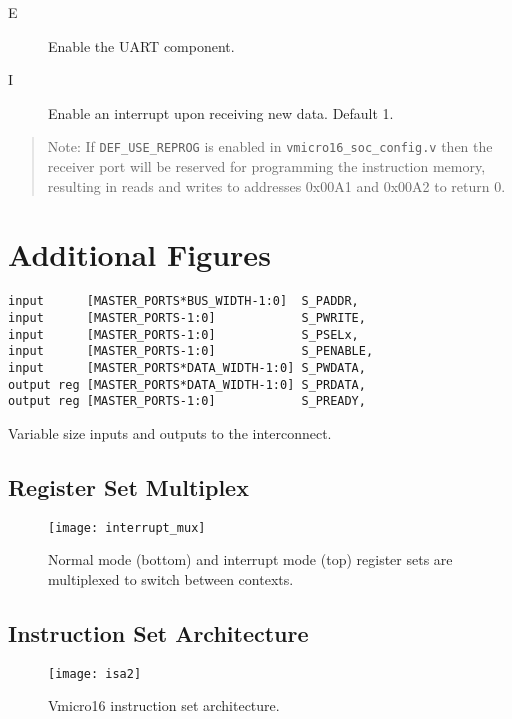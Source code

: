 \begin{appendices}
\begin{description}
\item [E] Enable the UART  component.
\item [I] Enable an interrupt upon receiving new data. Default 1.
\end{description}

\begin{quote}
Note: If \verb|DEF_USE_REPROG| is enabled in \verb|vmicro16_soc_config.v| then the receiver port will be reserved for programming the instruction memory, resulting in reads and writes to addresses 0x00A1 and 0x00A2 to return 0.
\end{quote}


\chapter{Additional Figures}

\begin{listing}[H]
\centering
\begin{verbatim}
input      [MASTER_PORTS*BUS_WIDTH-1:0]  S_PADDR,
input      [MASTER_PORTS-1:0]            S_PWRITE,
input      [MASTER_PORTS-1:0]            S_PSELx,
input      [MASTER_PORTS-1:0]            S_PENABLE,
input      [MASTER_PORTS*DATA_WIDTH-1:0] S_PWDATA,
output reg [MASTER_PORTS*DATA_WIDTH-1:0] S_PRDATA,
output reg [MASTER_PORTS-1:0]            S_PREADY,
\end{verbatim}
\caption{Variable size inputs and outputs to the interconnect.}
\label{lst:widemaster}
\end{listing}

\section{Register Set Multiplex}
\begin{figure}[H]
\centering
\texttt{[image: interrupt\_mux]}
\caption{Normal mode (bottom) and interrupt mode (top) register sets are multiplexed to switch between contexts.}
\label{fig:regmult}
\end{figure}


\section{Instruction Set Architecture}
\begin{figure}[H]
\centering
\texttt{[image: isa2]}
\caption{Vmicro16 instruction set architecture.}
\label{fig:isa}
\end{figure}


\end{appendices}
